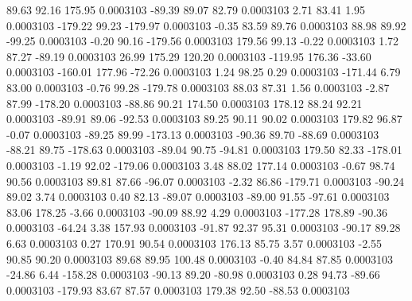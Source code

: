        89.63       92.16      175.95     0.0003103
      -89.39       89.07       82.79     0.0003103
        2.71       83.41        1.95     0.0003103
     -179.22       99.23     -179.97     0.0003103
       -0.35       83.59       89.76     0.0003103
       88.98       89.92      -99.25     0.0003103
       -0.20       90.16     -179.56     0.0003103
      179.56       99.13       -0.22     0.0003103
        1.72       87.27      -89.19     0.0003103
       26.99      175.29      120.20     0.0003103
     -119.95      176.36      -33.60     0.0003103
     -160.01      177.96      -72.26     0.0003103
        1.24       98.25        0.29     0.0003103
     -171.44        6.79       83.00     0.0003103
       -0.76       99.28     -179.78     0.0003103
       88.03       87.31        1.56     0.0003103
       -2.87       87.99     -178.20     0.0003103
      -88.86       90.21      174.50     0.0003103
      178.12       88.24       92.21     0.0003103
      -89.91       89.06      -92.53     0.0003103
       89.25       90.11       90.02     0.0003103
      179.82       96.87       -0.07     0.0003103
      -89.25       89.99     -173.13     0.0003103
      -90.36       89.70      -88.69     0.0003103
      -88.21       89.75     -178.63     0.0003103
      -89.04       90.75      -94.81     0.0003103
      179.50       82.33     -178.01     0.0003103
       -1.19       92.02     -179.06     0.0003103
        3.48       88.02      177.14     0.0003103
       -0.67       98.74       90.56     0.0003103
       89.81       87.66      -96.07     0.0003103
       -2.32       86.86     -179.71     0.0003103
      -90.24       89.02        3.74     0.0003103
        0.40       82.13      -89.07     0.0003103
      -89.00       91.55      -97.61     0.0003103
       83.06      178.25       -3.66     0.0003103
      -90.09       88.92        4.29     0.0003103
     -177.28      178.89      -90.36     0.0003103
      -64.24        3.38      157.93     0.0003103
      -91.87       92.37       95.31     0.0003103
      -90.17       89.28        6.63     0.0003103
        0.27      170.91       90.54     0.0003103
      176.13       85.75        3.57     0.0003103
       -2.55       90.85       90.20     0.0003103
       89.68       89.95      100.48     0.0003103
       -0.40       84.84       87.85     0.0003103
      -24.86        6.44     -158.28     0.0003103
      -90.13       89.20      -80.98     0.0003103
        0.28       94.73      -89.66     0.0003103
     -179.93       83.67       87.57     0.0003103
      179.38       92.50      -88.53     0.0003103
